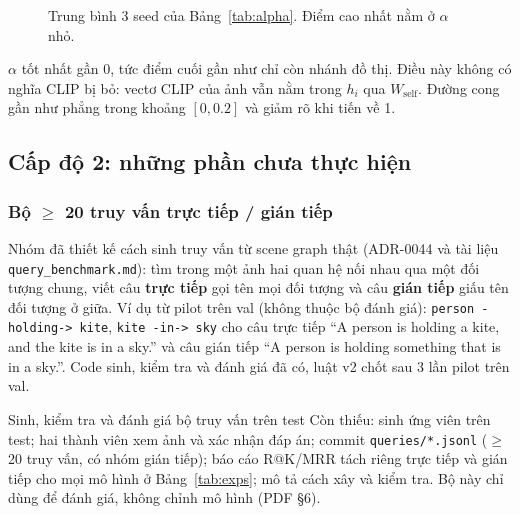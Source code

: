 \documentclass[12pt, a4paper]{article}
\makeatletter
\newcommand{\code}[1]{\texttt{#1}}
\newcommand{\mrr}{MRR@100}
\makeatother
\begin{document}
\begin{figure}[H]
\centering
{}
\caption{Trung bình 3 seed của Bảng~\ref{tab:alpha}. Điểm cao nhất nằm ở $\alpha$ nhỏ.}
\label{fig:alpha}
\end{figure}

$\alpha$ tốt nhất gần 0, tức điểm cuối gần như chỉ còn nhánh đồ thị. Điều này không có nghĩa CLIP bị bỏ: vectơ CLIP của ảnh vẫn nằm trong $h_i$ qua $W_{\text{self}}$. Đường cong gần như phẳng trong khoảng $[0, 0.2]$ và giảm rõ khi tiến về 1.

\subsection{Cấp độ 2: những phần chưa thực hiện}
\label{sec:level2}

\subsubsection{Bộ $\ge$ 20 truy vấn trực tiếp / gián tiếp}
Nhóm đã thiết kế cách sinh truy vấn từ scene graph thật (ADR-0044 và tài liệu \code{query\_benchmark.md}): tìm trong một ảnh hai quan hệ nối nhau qua một đối tượng chung, viết câu \textbf{trực tiếp} gọi tên mọi đối tượng và câu \textbf{gián tiếp} giấu tên đối tượng ở giữa. Ví dụ từ pilot trên val (không thuộc bộ đánh giá): \code{person -holding-> kite}, \code{kite -in-> sky} cho câu trực tiếp ``A person is holding a kite, and the kite is in a sky.'' và câu gián tiếp ``A person is holding something that is in a sky.''. Code sinh, kiểm tra và đánh giá đã có, luật v2 chốt sau 3 lần pilot trên val.
\begin{chualam}{Sinh, kiểm tra và đánh giá bộ truy vấn trên test}
Còn thiếu: sinh ứng viên trên test; hai thành viên xem ảnh và xác nhận đáp án; commit \code{queries/*.jsonl} ($\ge$20 truy vấn, có nhóm gián tiếp); báo cáo R@K/MRR tách riêng trực tiếp và gián tiếp cho mọi mô hình ở Bảng~\ref{tab:exps}; mô tả cách xây và kiểm tra. Bộ này chỉ dùng để đánh giá, không chỉnh mô hình (PDF §6).
\end{chualam}
\end{document}
